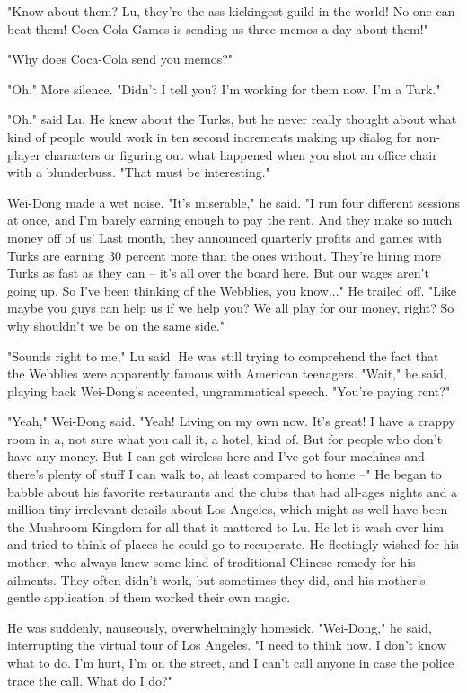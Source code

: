 "Know about them? Lu, they're the ass-kickingest guild in the
world! No one can beat them! Coca-Cola Games is sending us three
memos a day about them!"

"Why does Coca-Cola send you memos?"

"Oh." More silence. "Didn't I tell you? I'm working for them now.
I'm a Turk."

"Oh," said Lu. He knew about the Turks, but he never really thought
about what kind of people would work in ten second increments
making up dialog for non-player characters or figuring out what
happened when you shot an office chair with a blunderbuss. "That
must be interesting."

Wei-Dong made a wet noise. "It's miserable," he said. "I run four
different sessions at once, and I'm barely earning enough to pay
the rent. And they make so much money off of us! Last month, they
announced quarterly profits and games with Turks are earning 30
percent more than the ones without. They're hiring more Turks as
fast as they can -- it's all over the board here. But our wages
aren't going up. So I've been thinking of the Webblies, you
know..." He trailed off. "Like maybe you guys can help us if we
help you? We all play for our money, right? So why shouldn't we be
on the same side."

"Sounds right to me," Lu said. He was still trying to comprehend
the fact that the Webblies were apparently famous with American
teenagers. "Wait," he said, playing back Wei-Dong's accented,
ungrammatical speech. "You're paying rent?"

"Yeah," Wei-Dong said. "Yeah! Living on my own now. It's great! I
have a crappy room in a, not sure what you call it, a hotel, kind
of. But for people who don't have any money. But I can get wireless
here and I've got four machines and there's plenty of stuff I can
walk to, at least compared to home --" He began to babble about his
favorite restaurants and the clubs that had all-ages nights and a
million tiny irrelevant details about Los Angeles, which might as
well have been the Mushroom Kingdom for all that it mattered to Lu.
He let it wash over him and tried to think of places he could go to
recuperate. He fleetingly wished for his mother, who always knew
some kind of traditional Chinese remedy for his ailments. They
often didn't work, but sometimes they did, and his mother's gentle
application of them worked their own magic.

He was suddenly, nauseously, overwhelmingly homesick. "Wei-Dong,"
he said, interrupting the virtual tour of Los Angeles. "I need to
think now. I don't know what to do. I'm hurt, I'm on the street,
and I can't call anyone in case the police trace the call. What do
I do?"

